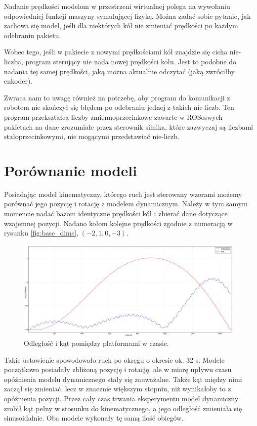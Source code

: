 		Nadanie prędkości modelom w przestrzeni wirtualnej polega na wywołaniu odpowiedniej funkcji maszyny symulującej fizykę.
		Można zadać sobie pytanie, jak zachowa się model, jeśli dla niektórych kół nie zmieniać prędkości po każdym odebraniu pakietu.

		Wobec tego, jeśli w pakiecie z nowymi prędkościami kół znajdzie się cicha nie-liczba, program sterujący nie nada nowej prędkości kołu.
		Jest to podobne do nadania tej samej prędkości, jaką można aktualnie odczytać (jaką zwróciłby enkoder).

		Zwraca nam to uwagę również na potrzebę, aby program do komunikacji z robotem nie skończył się błędem po odebraniu jednej z takich nie-liczb.
		Ten program przekształca liczby zmiennoprzecinkowe zawarte w ROSoswych pakietach na dane zrozumiałe przez sterownik silnika, które zazwyczaj są liczbami
		stałoprzecinkowymi, nie mogącymi przedstawiać nie-liczb.

\section{Porównanie modeli}
	Posiadając model kinematyczny, którego ruch jest sterowany wzorami możemy porównać jego pozycję i rotację z modelem dynamicznym.
	Należy w tym samym momencie nadać bazom identyczne prędkości kół i zbierać dane dotyczące wzajemnej pozycji.
	Nadano kołom kolejne prędkości zgodnie z numeracją w rysunku \ref{fig:base_dims}, $(-2 , 1 , 0 , -3)$.

	\begin{figure}[H]
	\centering
	\includegraphics[width=\textwidth]{graphics/test1.png}
	\caption{Odległość i kąt pomiędzy platformami w czasie.}
	\end{figure} 

	Takie ustawienie spowodowało ruch po okręgu o okresie ok. 32 s.
	Modele początkowo posiadały zbliżoną pozycję i rotację, ale w miarę upływu czasu opóźnienia modelu dynamicznego stały się zauważalne.
	Także kąt między nimi zaczął się zmieniać, lecz w znacznie większym stopniu, niż wynikałoby to z opóźnienia pozycji.
	Przez cały czas trwania eksperymentu model dynamiczny zrobił kąt pełny w stosunku do kinematycznego, a jego odległość zmieniała się sinusoidalnie.
	Oba modele wykonały tę samą ilość obiegów.

